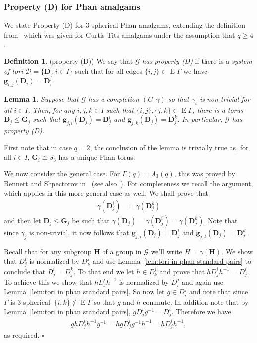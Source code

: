 \documentclass[12pt]{amsart}
\newtheorem{lemma}[theorem]{Lemma}
\theoremstyle{definition}
\newtheorem{definition}[theorem]{Definition}
\newcommand{\bpf}{\noindent{\bf Proof}\hspace{7pt}}
\newcommand{\epf}{\qed}
\newcommand{\ble}{\begin{lemma}}
\newcommand{\ele}{\end{lemma}}
\newcommand{\bde}{\begin{definition}}
\newcommand{\ede}{\end{definition}}
\newcommand{\cD}{{\mathcal D}}
\def\cD{{\mathcal D}}
\newcommand{\dfn}{\em}
\renewcommand{\qed}{\hfill $\square$}
\newcommand{\amgrpD}{{\mathbf{D}}}
\newcommand{\amgrpG}{{\mathbf{G}}}
\newcommand{\amgrpH}{{\mathbf{H}}}
\newcommand{\amg}{{\mathbf g}}
\newcommand{\compG}{{{G}}}
\newcommand{\compg}{\gamma}
\newcommand{\amG}{{\mathscr{G}}}
\newcommand{\nom}{}
\DeclareMathOperator{\edg}{E}
\newcommand{\liediag}{\Gamma}
\begin{document}
\subsubsection{Property (D) for Phan amalgams}\label{subsubsec:Phan property D}
We state Property (D) for $3$-spherical Phan amalgams, extending the definition from~\cite{BloHof2014b} which was given for Curtis-Tits amalgams under the assumption that $q\ge 4$.
\bde\label{dfn:property D}\nom{{(\rm property (D))}}{}
We say that $\amG$ {\dfn has property (D)} if there is a {\dfn system of tori} $\cD=\{\amgrpD_i\colon i\in I\}$ such that for all edges $\{i,j\}\in \edg\liediag$ we have  $\amg_{i,j}(\amgrpD_i)=\amgrpD_i^j$.
\ede
\ble\label{lem:non-collapsing Phan has property D}
Suppose that $\amG$ has a completion $(\compG,\compg)$ so that $\compg_i$ is non-trivial for all $i\in I$.
Then, for any $i,j,k\in I$ such that $\{i,j\},\{j,k\}\in \edg\liediag$, there is a torus $\amgrpD_j\le \amgrpG_j$ such that 
 $\amg_{j,i}(\amgrpD_j)=\amgrpD_j^i$ and $\amg_{j,k}(\amgrpD_j)=\amgrpD_j^k$.
In particular, $\amG$ has property (D).
\ele
\bpf
First note that in case $q=2$, the conclusion of the lemma is trivially true as, for all $i\in I$, $\amgrpG_i\cong S_3$ has a unique Phan torus.

We now consider the general case.
For $\liediag(q)=A_3(q)$, this was proved by Bennett and Shpectorov in~\cite{BeSh2004} (see also~\cite{BloHof2014b}).
For completeness we recall the argument, which applies in this more general case as well.
We shall prove that 
 \begin{align*}
 \compg(\amgrpD_j^i)&=\compg(\amgrpD_j^k)
 \end{align*}
and then let  $\amgrpD_j\le \amgrpG_j$ be such that $\compg(\amgrpD_j)= \compg(\amgrpD_j^i)=\compg(\amgrpD_j^k)$.
Note that since $\compg_j$ is non-trivial, it now follows that $\amg_{j,i}(\amgrpD_j)=\amgrpD_j^i$ and $\amg_{j,k}(\amgrpD_j)=\amgrpD_j^k$.

Recall that for any subgroup $\amgrpH$ of a group in $\amG$ we'll write $H=\compg(\amgrpH)$.
We show that $D_j^i$ is normalized by $D_k^j$ and use Lemma~\ref{lem:tori in phan standard pairs} to conclude that 
 $D_j^i=D_j^k$.
To that end we let $h\in D_k^j$  and prove that $hD_j^ih^{-1}=D_j^i$. To achieve this we show that $hD_j^ih^{-1}$ is normalized by $D_i^j$ and again use Lemma~\ref{lem:tori in phan standard pairs}.
So now let $g\in D_i^j$ and 
note that since $\liediag$ is $3$-spherical, $\{i,k\}\not\in \edg\liediag$ so that $g$ and $h$ commute.
In addition note that  by Lemma~\ref{lem:tori in phan standard pairs},  $gD_j^ig^{-1}=D_j^i$.
Therefore we have 
\begin{align*}
ghD_j^i h^{-1}g^{-1}= hg D_j^i g^{-1}h^{-1}= h D_j^i h^{-1},
\end{align*}
as required.
\epf
\end{document}
